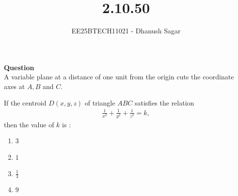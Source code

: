 \documentclass[journal]{IEEEtran}
\begin{document}



\title{2.10.50}
\author{EE25BTECH11021 - Dhanush Sagar
}
{\let\newpage\relax\maketitle}

\renewcommand{\thefigure}{\theenumi}
\renewcommand{\thetable}{\theenumi}
\setlength{\intextsep}{10pt} %


\renewcommand{\thetable}{\theenumi}


\textbf{Question} \\
A variable plane at a distance of one unit from the origin cuts the coordinate axes at $A, B$ and $C$.  


If the centroid $D(x,y,z)$ of triangle $ABC$ satisfies the relation  
\begin{align*}
\frac{1}{x^{2}} + \frac{1}{y^{2}} + \frac{1}{z^{2}} = k,
\end{align*}
then the value of $k$ is :  

\begin{multicols}{2}
\begin{enumerate}
   \item $3$
    \item $1$
    \item $\tfrac{1}{3}$
    \item $9$
\end{enumerate}
\end{multicols}
\end{document}
